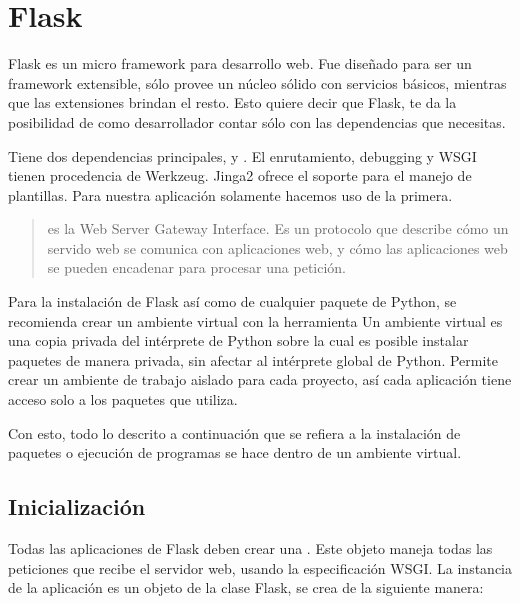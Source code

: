 

\section*{Flask}
\label{\detokenize{chapter_two/desc_cloudnao:flask}}

Flask es un micro framework para desarrollo web. Fue diseñado para ser un
framework extensible, sólo provee un núcleo sólido con servicios básicos,
mientras que las extensiones brindan el resto. Esto quiere decir que Flask,
te da la posibilidad de como desarrollador contar sólo con las dependencias que
necesitas.

Tiene dos dependencias principales,  y .
El enrutamiento, debugging y WSGI tienen procedencia de Werkzeug.
Jinga2 ofrece el soporte para el manejo de plantillas. Para nuestra
aplicación solamente hacemos uso de la primera.
\begin{quote}

 es la Web Server Gateway Interface. Es un protocolo que describe
cómo un servido web se comunica con aplicaciones web, y cómo las aplicaciones
web se pueden encadenar para procesar una petición.
\end{quote}

Para la instalación de Flask así como de cualquier paquete de Python, se
recomienda crear un ambiente virtual con la herramienta 
Un ambiente virtual es una copia privada del intérprete de Python sobre la cual
es posible instalar paquetes de manera privada, sin afectar al intérprete
global de Python. Permite crear un ambiente de trabajo aislado para cada
proyecto, así cada aplicación tiene acceso solo a los paquetes que utiliza.

Con esto, todo lo descrito a continuación que se refiera a la instalación de
paquetes o ejecución de programas se hace dentro de un ambiente virtual.


\subsection*{Inicialización}
\label{\detokenize{chapter_two/desc_cloudnao:inicializacion}}
Todas las aplicaciones de Flask deben crear una . Este
objeto maneja todas las peticiones que recibe el servidor web, usando
la especificación WSGI.
La instancia de la aplicación es un objeto de la clase Flask,
se crea de la siguiente manera:

